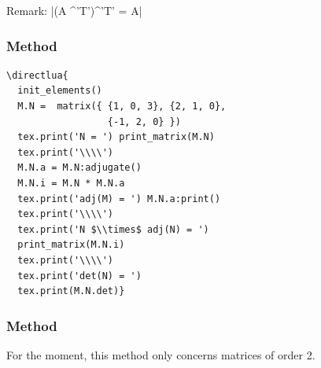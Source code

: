 \vspace{.5em}
Remark: |(A ^'T')^'T' = A|

\subsubsection{Method }
\label{ssub:method_adjugate}

\begin{minipage}{.6\textwidth}
\begin{verbatim}
\directlua{
  init_elements()
  M.N =  matrix({ {1, 0, 3}, {2, 1, 0},
                  {-1, 2, 0} })
  tex.print('N = ') print_matrix(M.N)
  tex.print('\\\\')
  M.N.a = M.N:adjugate()
  M.N.i = M.N * M.N.a
  tex.print('adj(M) = ') M.N.a:print()
  tex.print('\\\\')
  tex.print('N $\\times$ adj(N) = ')
  print_matrix(M.N.i)
  tex.print('\\\\')
  tex.print('det(N) = ')
  tex.print(M.N.det)}
\end{verbatim}
\end{minipage}
\begin{minipage}{.4\textwidth}
\end{minipage}
\newpage


\subsubsection{Method }
\label{ssub:diagonalization}

For the moment, this method only concerns matrices of order 2.

